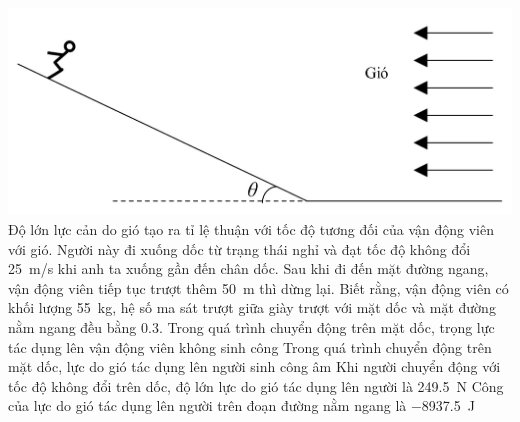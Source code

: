 \begin{ex}
	{\includegraphics[scale=0.35]{../figs/D10-KTTX2-HK2-3}}
	Độ lớn lực cản do gió tạo ra tỉ lệ thuận với tốc độ tương đối của vận động viên với gió. Người này đi xuống dốc từ trạng thái nghỉ và đạt tốc độ không đổi \SI{25}{\meter/\second} khi anh ta xuống gần đến chân dốc. Sau khi đi đến mặt đường ngang, vận động viên tiếp tục trượt thêm \SI{50}{\meter} thì dừng lại. Biết rằng, vận động viên có khối lượng \SI{55}{\kilogram}, hệ số ma sát trượt giữa giày trượt với mặt dốc và mặt đường nằm ngang đều bằng \SI{0.3}{}.
	\choiceTF
	{Trong quá trình chuyển động trên mặt dốc, trọng lực tác dụng lên vận động viên không sinh công}
	{\True Trong quá trình chuyển động trên mặt dốc, lực do gió tác dụng lên người sinh công âm}
	{Khi người chuyển động với tốc độ không đổi trên dốc, độ lớn lực do gió tác dụng lên người là \SI{249.5}{\newton}}
	{\True Công của lực do gió tác dụng lên người trên đoạn đường nằm ngang là \SI{-8937.5}{\joule}}
	\loigiai{}
\end{ex}
